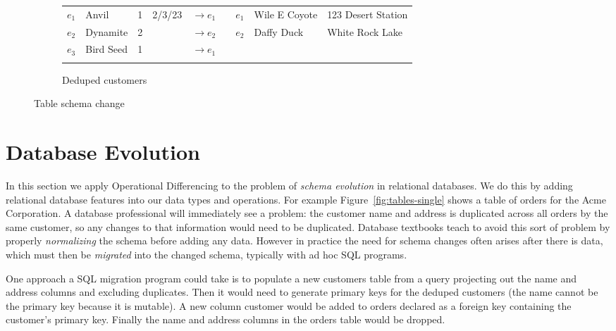 \documentclass[english,submission]{programming}
\theoremstyle{definition}
\newcommand{\citet}[1]{\citeauthor*{#1}~\cite{#1}}
\begin{document}
\begin{figure}
\begin{subfigure}[b]{40em}
\begin{tabular}{ r|l|r|r|r|cr|l|l|}
     $e_1$ & Anvil & 1 & 2/3/23 & $\rightarrow\!e_1$ && $e_1$ & Wile E Coyote & 123 Desert Station \\
     \hhline{~----~~--}
     $e_2$ & Dynamite & 2 & & $\rightarrow\!e_2$ && $e_2$ & Daffy Duck & White Rock Lake \\
     \hhline{~----~~--}
     $e_3$ & Bird Seed & 1 & & $\rightarrow\!e_1$ && \multicolumn{3}{l}{}$e_3$\\
     \hhline{~----~~~~}
  \end{tabular}
  \caption{Deduped customers}
  \label{fig:tables-dedup}
\end{subfigure}
\vspace{-8pt}
\caption{Table schema change}
\label{fig:tables}
\end{figure}


\section{Database Evolution}\label{db-evolution}

In this section we apply Operational Differencing to the problem of \textit{schema evolution} in relational databases. We do this by adding relational database features into our data types and operations.
For example Figure~\ref{fig:tables-single} shows a table of orders for the Acme Corporation. A database professional will immediately see a problem: the customer name and address is duplicated across all orders by the same customer, so any changes to that information would need to be duplicated.
Database textbooks teach to avoid this sort of problem by properly \textit{normalizing} the schema before adding any data. However in practice the need for schema changes often arises after there is data, which must then be \textit{migrated} into the changed schema, typically with ad hoc SQL programs.

One approach a SQL migration program could take is to populate a new \textsf{customers} table from a query projecting out the \textsf{name} and \textsf{address} columns and excluding duplicates. Then it would need to generate primary keys for the deduped customers (the name cannot be the primary key because it is mutable). A new column \textsf{customer} would be added to \textsf{orders} declared as a foreign key containing the customer's primary key. Finally the \textsf{name} and \textsf{address} columns in the \textsf{orders} table would be dropped.
\end{document}
